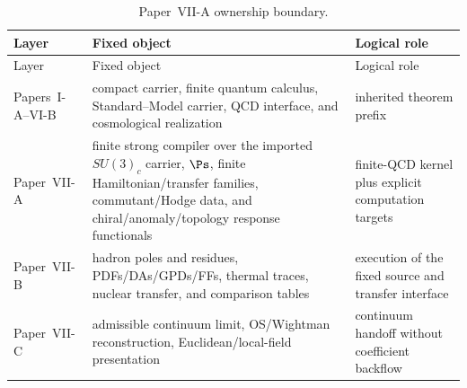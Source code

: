 \documentclass[12pt,a4paper]{article}
\begin{document}
\begin{longtable}{>{\raggedright\arraybackslash}p{} >{\raggedright\arraybackslash}p{} >{\raggedright\arraybackslash}p{}}
\caption[Paper-VII-A ownership boundary]{Paper~VII-A ownership boundary.}\label{p10:tab:paper-x-ownership-boundary}\\
\toprule
Layer & Fixed object & Logical role \\
\midrule
\endfirsthead
\toprule
Layer & Fixed object & Logical role \\
\midrule
\endhead
Papers~I-A--VI-B & compact carrier, finite quantum calculus, Standard--Model carrier, QCD interface, and cosmological realization & inherited theorem prefix \\
Paper~VII-A & finite strong compiler over the imported \(SU(3)_c\) carrier, \(\Ps\), finite Hamiltonian/transfer families, commutant/Hodge data, and chiral/anomaly/topology response functionals & finite-QCD kernel plus explicit computation targets \\
Paper~VII-B & hadron poles and residues, PDFs/DAs/GPDs/FFs, thermal traces, nuclear transfer, and comparison tables & execution of the fixed source and transfer interface \\
Paper~VII-C & admissible continuum limit, OS/Wightman reconstruction, Euclidean/local-field presentation & continuum handoff without coefficient backflow \\
\bottomrule
\end{longtable}
\end{document}
